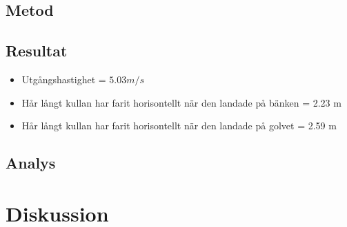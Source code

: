 \documentclass[11pt]{article}
\begin{document}
    \subsection{Metod}


    \subsection{Resultat}

    \begin{itemize}
        \item Utgångshastighet = $5.03 m/s$
        \item Hår långt kullan har farit horisontellt när den landade på bänken = 2.23 m
        \item Hår långt kullan har farit horisontellt när den landade på golvet = 2.59 m
    \end{itemize}
    \subsection{Analys}

    \section{Diskussion}
\end{document}
